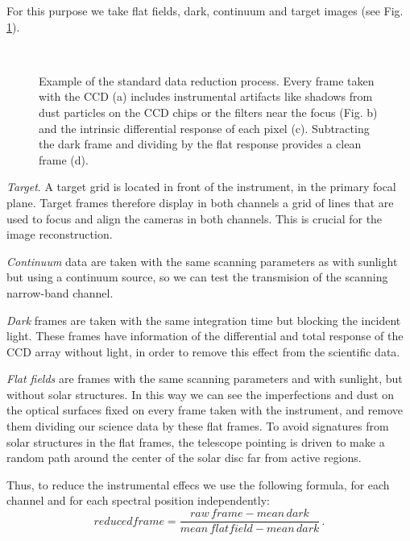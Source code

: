 For this purpose we take flat fields, dark, continuum and target images (see Fig. \ref {fig:obs:red}).
\begin{figure}[t]
  \centering
  \quad%
    \\
  \quad%
  \quad%
    \caption{Example of the standard data reduction process. Every frame taken with the CCD   (a) includes instrumental artifacts like shadows from dust particles on the CCD chips or the filters near the focus (Fig. b) and the intrinsic differential response of each pixel (c). Subtracting the dark frame and dividing by the flat response provides a clean frame (d).}
\label{fig:obs:red}

\end{figure}


\emph{Target}. A target grid is located in front of the instrument, in the primary focal plane. Target frames therefore display in both channels a grid of lines that are used to focus and align the cameras in both channels. This is crucial for the image reconstruction. 

\emph{Continuum} data are taken with the same scanning parameters as with sunlight but using a continuum source, so we can test the transmision of the scanning narrow-band channel. 

\emph{Dark} frames are taken with the same integration time but blocking the incident light. These frames have information of the differential and total response of the CCD array without light, in order to remove this effect from the scientific data. 

\emph{Flat fields}  are frames with the same scanning parameters and with sunlight, but without solar structures. In this way we can see the imperfections and dust on the optical surfaces fixed on every frame taken with the instrument, and remove them dividing our science data by these flat frames. To avoid signatures from solar structures in the flat frames, the telescope pointing is driven to make a random path around the center of the solar disc far from active regions.

Thus, to reduce the instrumental effecs we use the following formula, for each channel and for each spectral position independently:
\begin{equation}
 reduced frame=\frac{raw\,frame  - mean\,dark}{mean\,flatfield - mean\,dark} \, .
\end{equation}


